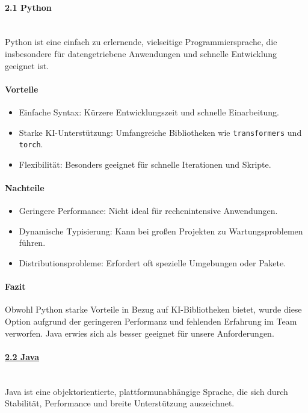 \documentclass[a4paper,12pt]{report}
\begin{document}
    \paragraph*{2.1 Python}\mbox{}\\
    Python ist eine einfach zu erlernende, vielseitige Programmiersprache, die insbesondere für datengetriebene Anwendungen und schnelle Entwicklung geeignet ist.

    \paragraph*{Vorteile}
    \begin{itemize}
        \item Einfache Syntax: Kürzere Entwicklungszeit und schnelle Einarbeitung.
        \item Starke KI-Unterstützung: Umfangreiche Bibliotheken wie \texttt{transformers} und \texttt{torch}.
        \item Flexibilität: Besonders geeignet für schnelle Iterationen und Skripte.
    \end{itemize}

    \paragraph*{Nachteile}
    \begin{itemize}
        \item Geringere Performance: Nicht ideal für rechenintensive Anwendungen.
        \item Dynamische Typisierung: Kann bei großen Projekten zu Wartungsproblemen führen.
        \item Distributionsprobleme: Erfordert oft spezielle Umgebungen oder Pakete.
    \end{itemize}

    \paragraph*{Fazit}
    Obwohl Python starke Vorteile in Bezug auf KI-Bibliotheken bietet, wurde diese Option aufgrund der geringeren Performanz und fehlenden Erfahrung im Team verworfen.
    Java erwies sich als besser geeignet für unsere Anforderungen.

    \paragraph*{\underline{2.2 Java}}\mbox{}\\
    Java ist eine objektorientierte, plattformunabhängige Sprache, die sich durch Stabilität, Performance und breite Unterstützung auszeichnet.
\end{document}
